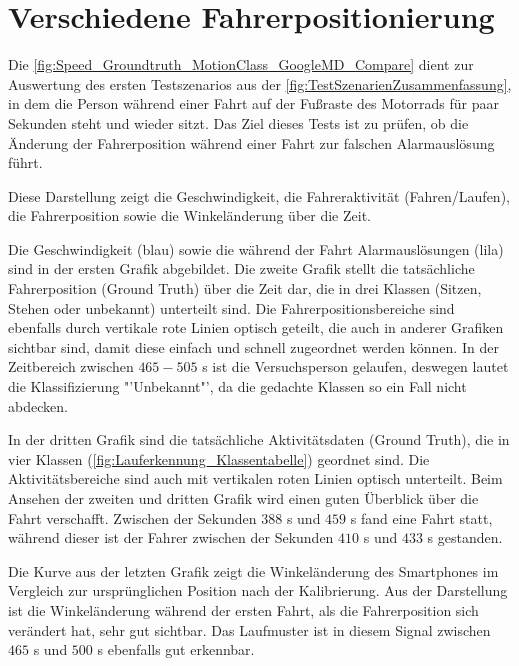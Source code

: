 \section{Verschiedene Fahrerpositionierung}
Die \autoref{fig:Speed_Groundtruth_MotionClass_GoogleMD_Compare} dient zur Auswertung des ersten Testszenarios aus der \autoref{fig:TestSzenarienZusammenfassung}, in dem die Person während einer Fahrt auf der Fußraste des Motorrads für paar Sekunden steht und wieder sitzt. Das Ziel dieses Tests ist zu prüfen, ob die Änderung der Fahrerposition während einer Fahrt zur falschen Alarmauslösung führt.

Diese Darstellung zeigt die Geschwindigkeit, die Fahreraktivität (Fahren/Laufen), die Fahrerposition sowie die Winkeländerung über die Zeit.

Die Geschwindigkeit (blau) sowie die während der Fahrt Alarmauslösungen (lila) sind in der ersten Grafik abgebildet.
Die zweite Grafik stellt die tatsächliche Fahrerposition (Ground Truth) über die Zeit dar, die in drei Klassen (Sitzen, Stehen oder unbekannt) unterteilt sind.
Die Fahrerpositionsbereiche sind ebenfalls durch vertikale rote Linien optisch geteilt, die auch in anderer Grafiken sichtbar sind, damit diese einfach und schnell zugeordnet werden können.
In der Zeitbereich zwischen $465 - 505$ s ist die Versuchsperson gelaufen, deswegen lautet die Klassifizierung "'Unbekannt"', da die gedachte Klassen so ein Fall nicht abdecken.

In der dritten Grafik sind die tatsächliche Aktivitätsdaten (Ground Truth), die in vier Klassen (\autoref{fig:Lauferkennung_Klassentabelle}) geordnet sind. Die Aktivitätsbereiche sind auch mit vertikalen roten Linien optisch unterteilt. Beim Ansehen der zweiten und dritten Grafik wird einen guten Überblick über die Fahrt verschafft. Zwischen der Sekunden $388$ s und $459$ s fand eine Fahrt statt, während dieser ist der Fahrer zwischen der Sekunden $410$ s und $433$ s gestanden.

Die Kurve aus der letzten Grafik zeigt die Winkeländerung des Smartphones im Vergleich zur ursprünglichen Position nach der Kalibrierung. Aus der Darstellung ist die Winkeländerung während der ersten Fahrt, als die Fahrerposition sich verändert hat, sehr gut sichtbar. Das Laufmuster ist in diesem Signal zwischen $465$ s und $500$ s ebenfalls gut erkennbar.

